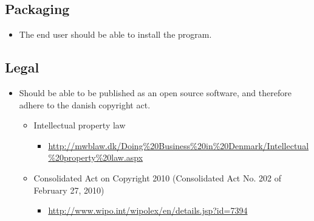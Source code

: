 \subsection{Packaging}
\begin{itemize}
\item The end user should be able to install the program.
\end{itemize}





\subsection{Legal}

\begin{itemize}
\item Should be able to be published as an open source software, and therefore adhere to the danish copyright act.
	\begin{itemize}
	\item Intellectual property law
		\begin{itemize}
		\item \url{http://mwblaw.dk/Doing%20Business%20in%20Denmark/Intellectual%20property%20law.aspx}
		\end{itemize}
	\item Consolidated Act on Copyright 2010 (Consolidated Act No. 202 of February 27, 2010)
		\begin{itemize}
		\item \url{http://www.wipo.int/wipolex/en/details.jsp?id=7394}
		\end{itemize}
	\end{itemize}
\end{itemize}




